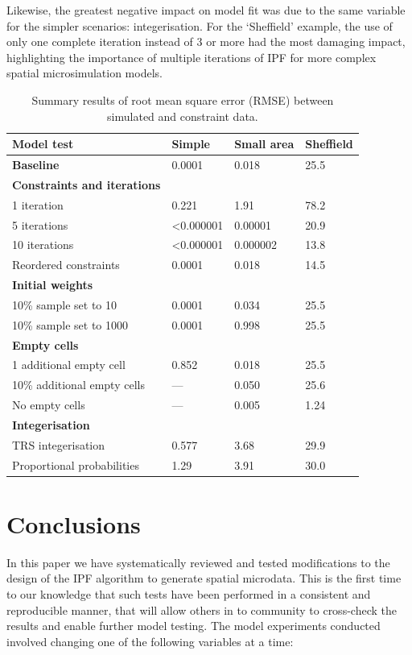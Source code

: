 \documentclass[a4paper,10pt]{article}
\begin{document}
Likewise, the greatest negative impact on model fit was due to the same variable
for the simpler scenarios: integerisation. For the `Sheffield' example, the
use of only one complete iteration instead of 3 or more had the most damaging impact,
highlighting the importance of multiple iterations of IPF for more complex
spatial microsimulation models.

\begin{table}[h]
\caption{Summary results of root mean square error (RMSE) between
simulated and constraint data.} \label{tsum}
\begin{center}
\begin{tabular}{llll}
\toprule
Model test & Simple & Small area  & Sheffield \\
\midrule
\textbf{Baseline} & 0.0001 & 0.018  & 25.5 \\
\midrule
\textbf{Constraints and iterations} &  &  & \\
1 iteration & 0.221 & 1.91 & 78.2 \\
5 iterations & \textless 0.000001 & 0.00001  & 20.9 \\
10 iterations & \textless 0.000001 & 0.000002  & 13.8 \\
Reordered constraints 		& 0.0001  & 0.018 & 14.5 \\ %
\midrule
\textbf{Initial weights} 	&  &  & \\
10\% sample set to 10  		& 0.0001 & 0.034  & 25.5\\
10\% sample set to 1000 	& 0.0001 & 0.998 & 25.5 \\
\midrule
\textbf{Empty cells} 		&  &  & \\
1 additional empty cell 	& 0.852 & 0.018  & 25.5 \\
10\% additional empty cells 	& --- & 0.050  & 25.6 \\
No empty cells			& --- & 0.005 & 1.24 \\
\midrule
\textbf{Integerisation} 	&  &  & \\
TRS integerisation		& 0.577 & 3.68  & 29.9 \\
Proportional probabilities & 1.29 & 3.91 & 30.0 \\
\bottomrule
\end{tabular}
\end{center}
\end{table}



\section{Conclusions}
In this paper we have systematically reviewed and tested modifications to the
design of the IPF algorithm to generate spatial microdata. This is the first time
to our knowledge that such tests have been performed in a consistent and reproducible
manner, that will allow others in to community to cross-check the results and enable
further model testing. The model experiments conducted involved changing one of the
following variables at a time:
\end{document}
